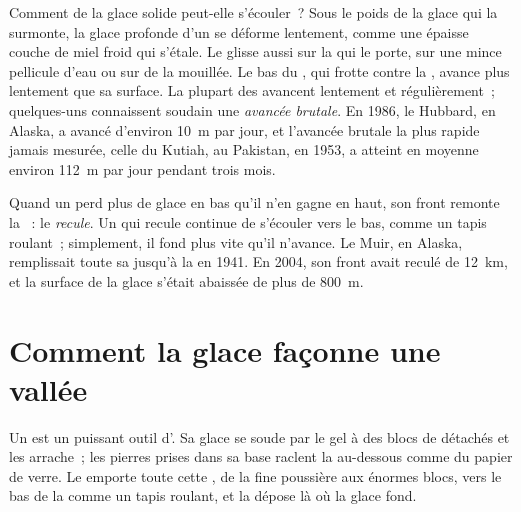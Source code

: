 Comment de la glace solide peut-elle s'écouler~? Sous le poids de la
glace qui la surmonte, la glace profonde d'un  se déforme
lentement, comme une épaisse couche de miel froid qui s'étale. Le 
glisse aussi sur la  qui le porte, sur une mince pellicule d'eau ou
sur de la  mouillée. Le bas du , qui frotte contre la ,
avance plus lentement que sa surface. La plupart des  avancent
lentement et régulièrement~; quelques-uns connaissent soudain une
\emph{avancée brutale}. En 1986, le  Hubbard, en Alaska, a avancé
d'environ \qty{10}{m} par jour, et l'avancée brutale la plus rapide jamais
mesurée, celle du  Kutiah, au Pakistan, en 1953, a atteint en
moyenne environ \qty{112}{m} par jour pendant trois mois.

Quand un  perd plus de glace en bas qu'il n'en gagne en haut, son
front remonte la ~: le  \emph{recule}. Un  qui recule
continue de s'écouler vers le bas, comme un tapis roulant~; simplement, il
fond plus vite qu'il n'avance. Le  Muir, en Alaska, remplissait
toute sa  jusqu'à la  en 1941. En 2004, son front avait reculé de
\qty{12}{km}, et la surface de la glace s'était abaissée de plus de
\qty{800}{m}.

\section{Comment la glace façonne une vallée}

Un  est un puissant outil d'. Sa glace se soude par le gel à
des blocs de  détachés et les arrache~; les pierres prises dans sa
base raclent la  au-dessous comme du papier de verre. Le 
emporte toute cette , de la fine poussière aux énormes blocs, vers le
bas de la  comme un tapis roulant, et la dépose là où la glace fond.


